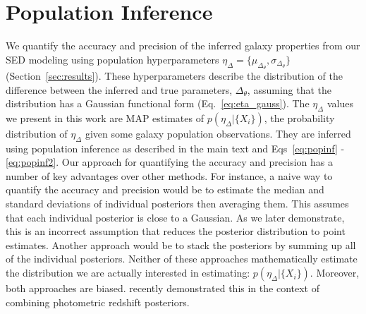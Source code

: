 \section{Population Inference} \label{sec:hyper}
We quantify the accuracy and precision of the inferred galaxy properties from
our SED modeling using population hyperparameters 
$\eta_{\Delta} = \{\mu_{\Delta_\theta}, \sigma_{\Delta_\theta}\}$ 
(Section~\ref{sec:results}). 
These hyperparameters describe the distribution of the difference between the
inferred and true parameters, $\Delta_{\theta}$, assuming that the distribution
has a Gaussian functional form (Eq.~\ref{eq:eta_gauss}). 
The $\eta_\Delta$ values we present in this work are MAP estimates of
$p(\eta_\Delta | \{ X_i \})$, the probability distribution of $\eta_\Delta$
given some galaxy population observations. 
They are inferred using population inference as described in the main text and
Eqs~\ref{eq:popinf} - \ref{eq:popinf2}.
Our approach for quantifying the accuracy and precision has a number of key
advantages over other methods. 
For instance, a naive way to quantify the accuracy and precision would be to
estimate the median and standard deviations of individual posteriors then
averaging them. 
This assumes that each individual posterior is close to a Gaussian. 
As we later demonstrate, this is an incorrect assumption that reduces the
posterior distribution to point estimates. 
Another approach would be to stack the posteriors by summing up all of the
individual posteriors. 
Neither of these approaches mathematically estimate the distribution we are
actually interested in estimating: $p(\eta_\Delta | \{ X_i \})$. 
Moreover, both approaches are biased. 
\cite{malz2020} recently demonstrated this in the context of combining
photometric redshift posteriors. 

